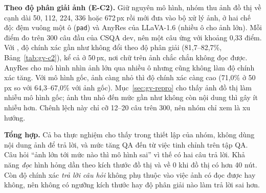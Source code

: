\textbf{Theo độ phân giải ảnh (E-C2).} Giữ nguyên mô hình, nhóm thu ảnh đồ thị về cạnh dài 50, 112, 224, 336 hoặc 672\,px rồi mới đưa vào bộ xử lý ảnh, ở hai chế độ: đệm vuông một ô (\texttt{pad}) và AnyRes của LLaVA-1.6 (nhiều ô cho ảnh lớn). Mỗi điểm đo trên 300 câu đầu của CSQA dev, nên một câu ứng với khoảng 0,33 điểm. Với \GV{}, độ chính xác gần như không đổi theo độ phân giải (81,7--82,7\%, Bảng~\ref{tab:gv-c2}), kể cả ở 50\,px, nơi chữ trên ảnh chắc chắn không đọc được. AnyRes cho mô hình nhìn ảnh lớn qua nhiều ô nhưng cũng không làm độ chính xác tăng. Với mô hình gốc, ảnh càng nhỏ thì độ chính xác càng cao (71,0\% ở 50\,px so với 64,3--67,0\% với ảnh gốc). Mục~\ref{sec:gv-repro} cho thấy ảnh đồ thị làm nhiễu mô hình gốc; ảnh thu nhỏ đến mức gần như không còn nội dung thì gây ít nhiễu hơn. Chênh lệch này chỉ cỡ 12--20 câu trên 300, nên nhóm chỉ xem là xu hướng.

\begin{table}[t]
\centering
\caption{Độ chính xác (\%) trên 300 câu đầu của CSQA dev khi thu ảnh đồ thị về cạnh dài cho trước (px)}
\label{tab:gv-c2}
\small
\setlength{\tabcolsep}{3pt}
\end{table}

\textbf{Tổng hợp.} Cả ba thực nghiệm cho thấy trong thiết lập của nhóm, \GV{} không dùng nội dung ảnh để trả lời, và mức tăng QA đến từ việc tinh chỉnh trên tập QA. Câu hỏi ``ảnh lớn tới mức nào thì mô hình sai'' vì thế có hai câu trả lời. Khả năng \emph{đọc} hình hỏng dần theo kích thước đồ thị và về 0 khi đồ thị có hơn 40 nút. Còn độ chính xác \emph{trả lời câu hỏi} không phụ thuộc vào việc ảnh có đọc được hay không, nên không có ngưỡng kích thước hay độ phân giải nào làm \GV{} trả lời sai hơn. 

